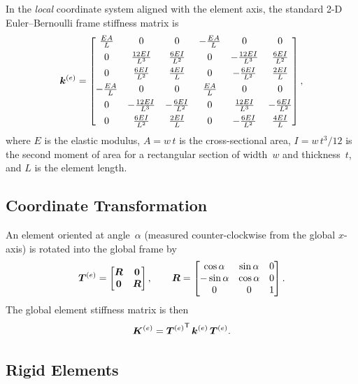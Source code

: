 In the \emph{local} coordinate system aligned with the element axis, the
standard 2-D Euler--Bernoulli frame stiffness matrix is
%
\begin{equation}
\label{eq:k_local}
\bm{k}^{(e)} =
\begin{bmatrix}
 \frac{EA}{L} & 0 & 0 & -\frac{EA}{L} & 0 & 0 \\[4pt]
 0 & \frac{12EI}{L^3} & \frac{6EI}{L^2} & 0 & -\frac{12EI}{L^3} & \frac{6EI}{L^2} \\[4pt]
 0 & \frac{6EI}{L^2} & \frac{4EI}{L} & 0 & -\frac{6EI}{L^2} & \frac{2EI}{L} \\[4pt]
 -\frac{EA}{L} & 0 & 0 & \frac{EA}{L} & 0 & 0 \\[4pt]
 0 & -\frac{12EI}{L^3} & -\frac{6EI}{L^2} & 0 & \frac{12EI}{L^3} & -\frac{6EI}{L^2} \\[4pt]
 0 & \frac{6EI}{L^2} & \frac{2EI}{L} & 0 & -\frac{6EI}{L^2} & \frac{4EI}{L}
\end{bmatrix},
\end{equation}
%
where $E$ is the elastic modulus, $A = w\,t$ is the cross-sectional area,
$I = w\,t^3/12$ is the second moment of area for a rectangular section of
width~$w$ and thickness~$t$, and $L$ is the element length.

\subsection{Coordinate Transformation}

An element oriented at angle~$\alpha$ (measured counter-clockwise from the
global $x$-axis) is rotated into the global frame by
%
\begin{equation}
\label{eq:transform}
\bm{T}^{(e)} =
\begin{bmatrix}
\bm{R} & \bm{0} \\
\bm{0} & \bm{R}
\end{bmatrix}, \qquad
\bm{R} =
\begin{bmatrix}
\cos\alpha & \sin\alpha & 0 \\
-\sin\alpha & \cos\alpha & 0 \\
0 & 0 & 1
\end{bmatrix}.
\end{equation}
%
The global element stiffness matrix is then
%
\begin{equation}
\label{eq:k_global}
    \bm{K}^{(e)} = {\bm{T}^{(e)}}^{\mathsf{T}}\, \bm{k}^{(e)}\, \bm{T}^{(e)}.
\end{equation}

\subsection{Rigid Elements}

